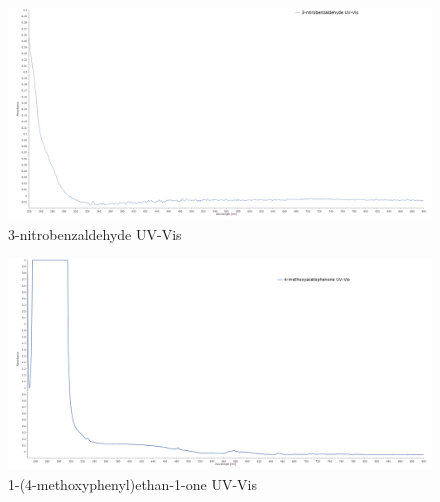 \documentclass[12pt]{article}
\begin{document}
\newpage
\begin{figure}[H]
    \centering
    \includegraphics[scale=0.234]{spectra/uvvis4.1.png}
    \caption{3-nitrobenzaldehyde UV-Vis}    
\end{figure}
\begin{figure}[H]
    \centering
    \includegraphics[scale=0.234]{spectra/uvvis5.1.png}
    \caption{1-(4-methoxyphenyl)ethan-1-one UV-Vis}    
\end{figure}
\end{document}
